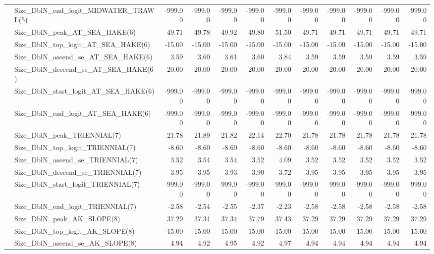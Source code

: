 \documentclass[
]{scrartcl}
\begin{document}
\begin{landscape}
\begin{longtable}{llrrrrrrrrrr}
 & Size\_DblN\_end\_logit\_MIDWATER\_TRAWL(5) & -999.00 & -999.00 & -999.00 & -999.00 & -999.00 & -999.00 & -999.00 & -999.00 & -999.00 & -999.00 \\ 
 & Size\_DblN\_peak\_AT\_SEA\_HAKE(6) & 49.71 & 49.78 & 49.92 & 49.80 & 51.50 & 49.71 & 49.71 & 49.71 & 49.71 & 49.71 \\ 
 & Size\_DblN\_top\_logit\_AT\_SEA\_HAKE(6) & -15.00 & -15.00 & -15.00 & -15.00 & -15.00 & -15.00 & -15.00 & -15.00 & -15.00 & -15.00 \\ 
 & Size\_DblN\_ascend\_se\_AT\_SEA\_HAKE(6) & 3.59 & 3.60 & 3.61 & 3.60 & 3.84 & 3.59 & 3.59 & 3.59 & 3.59 & 3.59 \\ 
 & Size\_DblN\_descend\_se\_AT\_SEA\_HAKE(6) & 20.00 & 20.00 & 20.00 & 20.00 & 20.00 & 20.00 & 20.00 & 20.00 & 20.00 & 20.00 \\ 
 & Size\_DblN\_start\_logit\_AT\_SEA\_HAKE(6) & -999.00 & -999.00 & -999.00 & -999.00 & -999.00 & -999.00 & -999.00 & -999.00 & -999.00 & -999.00 \\ 
 & Size\_DblN\_end\_logit\_AT\_SEA\_HAKE(6) & -999.00 & -999.00 & -999.00 & -999.00 & -999.00 & -999.00 & -999.00 & -999.00 & -999.00 & -999.00 \\ 
 & Size\_DblN\_peak\_TRIENNIAL(7) & 21.78 & 21.89 & 21.82 & 22.14 & 22.70 & 21.78 & 21.78 & 21.78 & 21.78 & 21.78 \\ 
 & Size\_DblN\_top\_logit\_TRIENNIAL(7) & -8.60 & -8.60 & -8.60 & -8.60 & -8.60 & -8.60 & -8.60 & -8.60 & -8.60 & -8.60 \\ 
 & Size\_DblN\_ascend\_se\_TRIENNIAL(7) & 3.52 & 3.54 & 3.54 & 3.52 & 4.09 & 3.52 & 3.52 & 3.52 & 3.52 & 3.52 \\ 
 & Size\_DblN\_descend\_se\_TRIENNIAL(7) & 3.95 & 3.95 & 3.93 & 3.90 & 3.72 & 3.95 & 3.95 & 3.95 & 3.95 & 3.95 \\ 
 & Size\_DblN\_start\_logit\_TRIENNIAL(7) & -999.00 & -999.00 & -999.00 & -999.00 & -999.00 & -999.00 & -999.00 & -999.00 & -999.00 & -999.00 \\ 
 & Size\_DblN\_end\_logit\_TRIENNIAL(7) & -2.58 & -2.54 & -2.55 & -2.37 & -2.23 & -2.58 & -2.58 & -2.58 & -2.58 & -2.58 \\ 
 & Size\_DblN\_peak\_AK\_SLOPE(8) & 37.29 & 37.34 & 37.34 & 37.79 & 37.43 & 37.29 & 37.29 & 37.29 & 37.29 & 37.29 \\ 
 & Size\_DblN\_top\_logit\_AK\_SLOPE(8) & -15.00 & -15.00 & -15.00 & -15.00 & -15.00 & -15.00 & -15.00 & -15.00 & -15.00 & -15.00 \\ 
 & Size\_DblN\_ascend\_se\_AK\_SLOPE(8) & 4.94 & 4.92 & 4.95 & 4.92 & 4.97 & 4.94 & 4.94 & 4.94 & 4.94 & 4.94 \\ 

\end{longtable}
\end{landscape}
\end{document}
